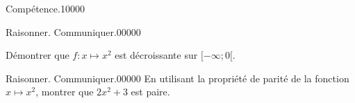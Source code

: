 \begin{pageParcoursu}
\begin{ExoCuN}{Compétence.}{1}{0}{0}{0}{0}

\end{ExoCuN}


\end{pageParcoursu} %
 

\begin{pageParcoursd} %

\begin{ExoCdN}{Raisonner. Communiquer.}{0}{0}{0}{0}{0}

Démontrer que $f:x\mapsto x^2$ est décroissante sur $[-\infty;0[$.\vspace{.2cm}


%
%
%
%
%
%
%

\end{ExoCdN}

\begin{ExoCdN}{Raisonner. Communiquer.}{0}{0}{0}{0}{0}
En utilisant la propriété de parité de la fonction $x\mapsto x^2$, montrer que $2x^2+3$ est paire.\vspace{.2cm}


\end{ExoCdN}


\end{pageParcoursd}
